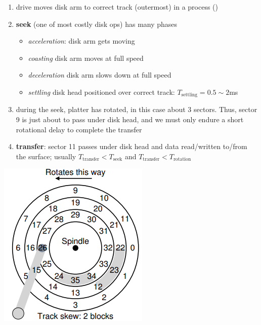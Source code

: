 \begin{enumerate}
\item drive moves disk arm to correct track (outermost) in a process ()
\item \textbf{seek} (one of most costly disk ops) has many phases
  \begin{itemize}[leftmargin=.1em]
  \item \emph{acceleration}: disk arm gets moving
  \item \emph{coasting} disk arm moves at full speed
  \item \emph{deceleration} disk arm slows down at full speed
  \item \emph{settling} disk head positioned over correct track: $T_{\text{settling}} = 0.5 \sim 2$ms
  \end{itemize}
\item[] during the seek, platter has rotated, in this case about 3 sectors. Thus, sector 9 is just about to pass under disk head, and we must only endure a short rotational delay to complete the transfer
\item \textbf{transfer}: sector 11 passes under disk head and data read/written to/from the surface; usually $T_{\text{transfer}} < T_{\text{seek}}$ and $T_{\text{transfer}} < T_{\text{rotation}}$
\end{enumerate}
\begin{minipage}{.45\linewidth}
  \includegraphics[width=\linewidth]{imgs/disk_trackskew}
\end{minipage}
